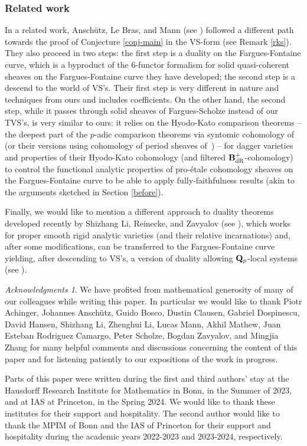\documentclass[10pt,reqno]{amsart}
\theoremstyle{definition}
\theoremstyle{remark}
\newtheorem*{acknowledgments}{Acknowledgments}
\newcommand{\dr}{\operatorname{dR} }
\numberwithin{equation}{section}
\def\Q{{\bf Q}} \def\Z{{\bf Z}}
\numberwithin{equation}{section}
\begin{document}
\subsubsection{Related work}  In a related work,  Ansch\"utz, Le Bras, and  Mann (see \cite{ALBM}) followed a different path towards the
proof of Conjecture \ref{conj-main} in the {\rm VS}-form (see Remark \ref{rks}).
 They also proceed in two steps: the first step is a duality on the Fargues-Fontaine curve, which is a byproduct of the  6-functor formalism for solid quasi-coherent sheaves on the Fargues-Fontaine curve they have developed; the second step is a descend to the world of {\rm VS}'s.
 Their first step is very different in nature and techniques from ours and includes coefficients.
 On the other hand, the second step, while it passes through solid sheaves of Fargues-Scholze instead 
of our {\rm TVS}'s,  is very similar to ours: it relies on the Hyodo-Kato comparison theorems -- the deepest part of the $p$-adic comparison theorems 
via syntomic cohomology of~\cite{CN1,CDN3,CN4,CN5} (or their versions using cohomology of period sheaves
of~\cite{GB2}) --
for   dagger varieties and properties of their Hyodo-Kato cohomology (and filtered $\B^+_{\dr}$-cohomology) to control the functional analytic properties of pro-\'etale cohomology sheaves on the Fargues-Fontaine curve to be able to apply fully-faithfulness results (akin to  the arguments sketched  in  Section \ref{before}). 

  Finally, we would like to mention a different approach to duality theorems developed recently by  Shizhang Li, Reinecke,  and Zavyalov (see \cite{LRZ}), which works for proper smooth rigid analytic varieties (and their relative incarnations) and, after some modifications, can be transferred to the Fargues-Fontaine curve yielding, after descending to {\rm VS}'s,  a version of duality allowing $\Q_p$-local systems (see \cite{LNRZ}).

\begin{acknowledgments}
We have profited from mathematical  generosity of many of our colleagues while writing this paper.
 In particular we would like to thank 
Piotr Achinger, Johannes Ansch\"utz, Guido Bosco,   Dustin Clausen, Gabriel Dospinescu, David Hansen, Shizhang Li, Zhenghui Li, Lucas Mann, Akhil Mathew, Juan Esteban Rodriguez Camargo,  Peter Scholze, Bogdan Zavyalov, and Mingjia Zhang  for many helpful comments and discussions concerning the content of this paper and for listening patiently to our expositions of the work in progress. 

Parts of this paper were written during the first and  third authors' stay at the Hausdorff Research Institute for Mathematics in Bonn, in the Summer of 2023, and at IAS at Princeton, in the Spring 2024. We would like to thank these institutes for their support and hospitality. The second author would like to thank the MPIM of Bonn and the IAS of Princeton for their support and hospitality during the academic years 2022-2023 and 2023-2024, respectively. 
\end{acknowledgments}
\end{document}
